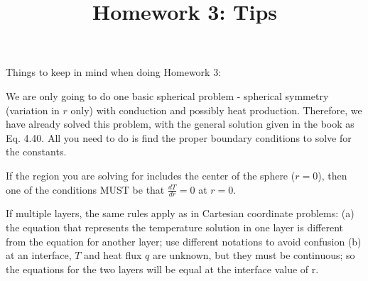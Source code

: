 \documentclass[12pt]{article}
\title{Homework 3: Tips}
\begin{document}
\maketitle

Things to keep in mind when doing Homework 3:

\begin{compactenum}
\item We are only going to do one basic spherical problem - spherical symmetry (variation in $r$ only) with conduction and possibly heat production. Therefore, we have already solved this problem, with the general solution given in the book as Eq. 4.40. All you need to do is find the proper boundary conditions to solve for the constants.
\item If the region you are solving for includes the center of the sphere ($r = 0$), then one of the conditions MUST be that $\frac{dT}{dr} = 0$ at $r = 0$.
\item If multiple layers, the same rules apply as in Cartesian coordinate problems: (a) the equation that represents the temperature solution in one layer is different from the equation for another layer; use different notations to avoid confusion (b) at an interface, $T$ and heat flux $q$ are unknown, but they must be continuous; so the equations for the two layers will be equal at the interface value of r.
\end{compactenum}
\end{document}
